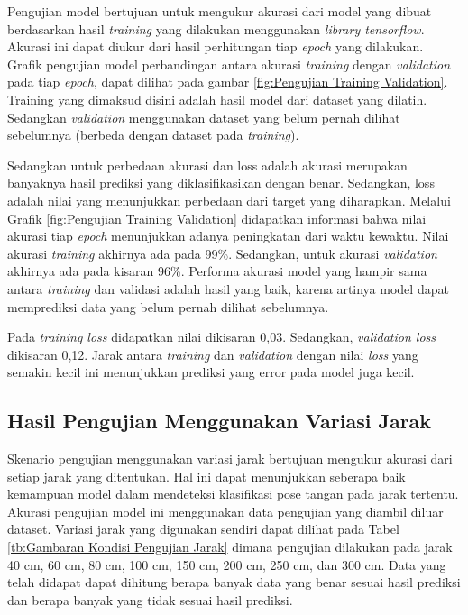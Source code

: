 \hfill \break

Pengujian model bertujuan untuk mengukur akurasi dari model yang dibuat berdasarkan hasil \emph{training} yang dilakukan menggunakan \emph{library tensorflow}. Akurasi ini dapat diukur dari hasil perhitungan tiap \emph{epoch} yang dilakukan. Grafik pengujian model perbandingan antara akurasi \emph{training} dengan \emph{validation} pada tiap \emph{epoch}, dapat dilihat pada gambar \ref{fig:Pengujian Training Validation}. Training yang dimaksud disini adalah hasil model dari dataset yang dilatih. Sedangkan \emph{validation} menggunakan dataset yang belum pernah dilihat sebelumnya (berbeda dengan dataset pada \emph{training}).

Sedangkan untuk perbedaan akurasi dan loss adalah akurasi merupakan banyaknya hasil prediksi yang diklasifikasikan dengan benar. Sedangkan, loss adalah nilai yang menunjukkan perbedaan dari target yang diharapkan. Melalui Grafik \ref{fig:Pengujian Training Validation} didapatkan informasi bahwa nilai akurasi tiap \emph{epoch} menunjukkan adanya peningkatan dari waktu kewaktu. Nilai akurasi \emph{\emph{training}} akhirnya ada pada 99\%. Sedangkan, untuk akurasi \emph{validation} akhirnya ada pada kisaran 96\%. Performa akurasi model yang hampir sama antara \emph{training} dan validasi adalah hasil yang baik, karena artinya model dapat memprediksi data yang belum pernah dilihat sebelumnya.

Pada \emph{training loss} didapatkan nilai dikisaran 0,03. Sedangkan, \emph{validation loss} dikisaran 0,12. Jarak antara \emph{training} dan \emph{validation} dengan nilai \emph{loss} yang semakin kecil ini menunjukkan prediksi yang error pada model juga kecil.

\subsection{Hasil Pengujian Menggunakan Variasi Jarak}
\label{subsec:Hasil Pengujian Menggunakan Variasi Jarak}

Skenario pengujian menggunakan variasi jarak bertujuan mengukur akurasi dari setiap jarak yang ditentukan. Hal ini dapat menunjukkan seberapa baik kemampuan model dalam mendeteksi klasifikasi pose tangan pada jarak tertentu. Akurasi pengujian model ini menggunakan data pengujian yang diambil diluar dataset. Variasi jarak yang digunakan sendiri dapat dilihat pada Tabel \ref{tb:Gambaran Kondisi Pengujian Jarak} dimana pengujian dilakukan pada jarak 40 cm, 60 cm, 80 cm, 100 cm, 150 cm, 200 cm, 250 cm, dan 300 cm. Data yang telah didapat dapat dihitung berapa banyak data yang benar sesuai hasil prediksi dan berapa banyak yang tidak sesuai hasil prediksi.

